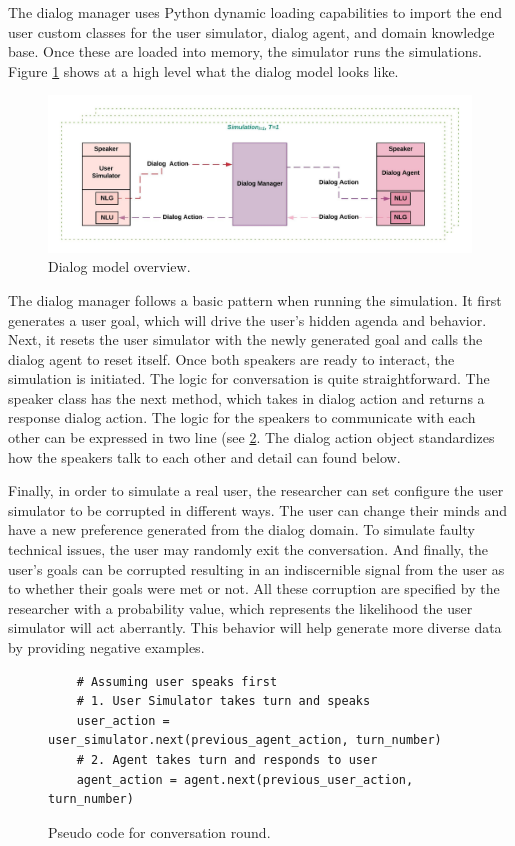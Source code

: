 The dialog manager uses Python dynamic loading capabilities to import the end user custom classes for the user simulator, dialog agent, and domain knowledge base. Once these are loaded into memory, the simulator runs the simulations. Figure 
\ref{fig:dialog_model} shows at a high level what the dialog model looks like. 
\begin{figure}[h!]
	\includegraphics[width=\linewidth]{diagrams/dialog_model.jpeg}
	\caption{ Dialog model overview. }
	\label{fig:dialog_model}
\end{figure}

The dialog manager follows a basic pattern when running the simulation. It first generates a user goal, which will drive the user's hidden agenda and behavior. Next, it resets the user simulator with the newly generated goal and calls the dialog agent to reset itself. Once both speakers are ready to interact, the simulation is initiated. The logic for conversation is quite straightforward. The speaker class has the next method, which takes in dialog action and returns a response dialog action. The logic for the speakers to communicate with each other can be expressed in two line (see \ref{fig:conv_round}. The dialog action object standardizes how the speakers talk to each other and detail can found below.  

Finally, in order to simulate a real user, the researcher can set configure the user simulator to be corrupted in different ways. The user can change their minds and have a new preference generated from the dialog domain. To simulate faulty technical issues, the user may randomly exit the conversation. And finally, the user's goals can be corrupted resulting in an indiscernible signal from the user as to whether their goals were met or not. All these corruption are specified by the researcher with a probability value, which represents the likelihood the user simulator will act aberrantly. This behavior will 
help generate more diverse data by providing negative examples.

\begin{figure}[h!]
	\label{fig:conv_round}
	\begin{lstlisting}
	# Assuming user speaks first 
	# 1. User Simulator takes turn and speaks
	user_action = user_simulator.next(previous_agent_action, turn_number)
	# 2. Agent takes turn and responds to user 
	agent_action = agent.next(previous_user_action, turn_number)
	\end{lstlisting}
	\caption{Pseudo code for conversation round.}
\end{figure}

